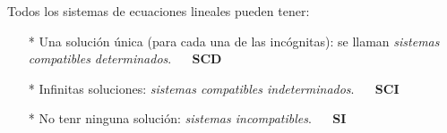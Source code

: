 \begin{theorem} 

Todos los sistemas de ecuaciones lineales pueden tener:

\begin{itemize}
\item [*] Una solución única (para cada una de las incógnitas): se llaman \emph{sistemas compatibles determinados}. $\quad$ \textbf{SCD}
\item [*] Infinitas soluciones: \emph{sistemas compatibles indeterminados}.  $\quad$ \textbf{SCI}
\item [*] No tenr ninguna solución: \emph{sistemas incompatibles}.  $\quad$ \textbf{SI}
\end{itemize}

\end{theorem}

